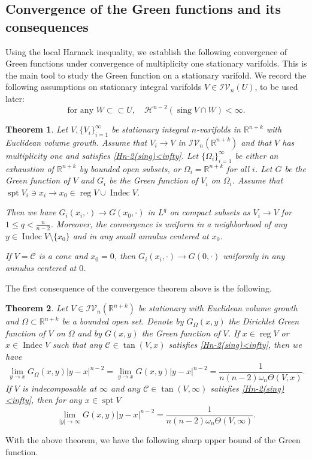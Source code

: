\documentclass[11pt]{amsart}
\newtheorem{theorem}{Theorem}[section]
\theoremstyle{definition}
\newcommand{\HH}{\mathcal{H}}
\newcommand{\R}{\mathbb{R}}
\newcommand{\C}{\mathcal{C}}
\newcommand{\IV}{\mathcal{IV}}
\newcommand{\ssubset}{\subset\subset}
\DeclareMathOperator{\spt}{spt}
\DeclareMathOperator{\sing}{sing}
\DeclareMathOperator{\reg}{reg}
\DeclareMathOperator{\indec}{Indec}
\begin{document}
\subsection{Convergence of the Green functions and its consequences}
Using the local Harnack inequality, we establish the following convergence of Green functions under convergence of multiplicity one stationary varifolds. This is the main tool to study the Green function on a stationary varifold. 
We  record the following assumptions on stationary integral varifolds $V\in \IV_n(U)$, to be used later: 
\begin{equation}
	\text{for any } W\ssubset U,\quad \HH^{n-2}(\sing V\cap W)<\infty\label{Hn-2(sing)<infty}.
\end{equation}
\begin{theorem}\label{conv}
	Let $V,\{V_i\}_{i=1}^\infty$ be stationary integral $n$-varifolds in $\R^{n+k}$ with Euclidean volume growth. Assume that $V_i \to V$ in $\IV_n(\R^{n+k})$ and that $V$ has multiplicity one and satisfies \eqref{Hn-2(sing)<infty}. Let $\{\Omega_i\}_{i=1}^\infty$ be either an exhaustion of $\R^{n+k}$ by bounded open subsets, or $\Omega_i = \R^{n+k}$ for all $i$. Let $G$ be the Green function of $V$ and $G_i$ be the Green function of $V_i$ on $\Omega_i$. Assume that $\spt V_i\ni x_i\to x_0\in \reg V\cup \indec V$. 
    
    Then we have $G_i(x_i,\cdot)\to G(x_0,\cdot)$ in $L^q$ on compact subsets as $V_i\to V$ for $1\le q<\frac{n}{n-2}$. Moreover, the convergence is uniform in a neighborhood of any $y\in \indec V\setminus \{x_0\}$ and in any small annulus centered at $x_0$.
    
    If $V=\C$ is a cone and $x_0=0$, then $G_i(x_i,\cdot)\to G(0,\cdot)$ uniformly in any annulus centered at $0$.
\end{theorem}
The first consequence of the convergence theorem above is the following.
\begin{theorem}\label{asymp}
    Let $V\in \IV_n(\R^{n+k})$ be stationary with Euclidean volume growth and $\Omega\subset \R^{n+k}$ be a bounded open set. Denote by $G_\Omega(x,y)$ the Dirichlet Green function of $V$ on $\Omega$ and by $G(x,y)$ the Green function of $V$.
    If $x\in \reg V$ or $x\in \indec  V$ such that any $\C\in \tan(V,x)$ satisfies \eqref{Hn-2(sing)<infty}, then we have
    \[\lim_{y\to x}G_\Omega(x,y)|y-x|^{n-2}=\lim_{y\to x}G(x,y)|y-x|^{n-2}=\frac{1}{n(n-2)\omega_n\Theta(V,x)}.
	\]
	If $V$ is indecomposable at $\infty$ and any $\C\in \tan(V,\infty)$ satisfies \eqref{Hn-2(sing)<infty}, then for any $x\in\spt V$
	\[\lim_{|y|\to \infty}G(x,y)|y-x|^{n-2}=\frac{1}{n(n-2)\omega_n\Theta(V,\infty)}.\]
\end{theorem}
With the above theorem, we have the following sharp upper bound of the Green function. 
\end{document}
